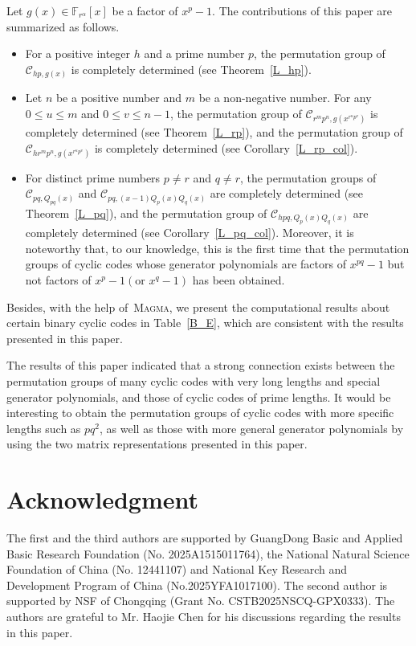 \documentclass[journal,12pt,onecolumn]{IEEEtran}
\begin{document}
Let $g(x)\in\mathbb{F}_{r^\alpha}[x]$ be a factor of $x^p-1$. The contributions of this paper are summarized as follows.
\begin{itemize}
    \item For a positive integer $h$ and a prime number $p$, the permutation group of $\mathcal{C}_{hp,g(x)}$ is completely determined (see Theorem~\ref{L_hp}). 
    \item Let $n$ be a positive number and $m$ be a non-negative number. For any $0\le u\le m$ and $0\le v\le n-1$, the permutation group of $\mathcal{C}_{r^mp^n,g(x^{r^up^v})}$ is completely determined (see Theorem~\ref{L_rp}), and the permutation group of $\mathcal{C}_{hr^mp^n,g(x^{r^up^v})}$ is completely determined (see Corollary~\ref{L_rp_col}). 
    \item For distinct prime numbers $p\neq r$ and $q\neq r$, the permutation groups  of $\mathcal{C}_{pq,Q_{pq}(x)}$ and $\mathcal{C}_{pq,(x-1)Q_p(x)Q_q(x)}$ are completely determined (see Theorem~\ref{L_pq}), and the permutation group of $\mathcal{C}_{hpq,Q_p(x)Q_q(x)}$ are completely determined (see Corollary~\ref{L_pq_col}). Moreover, it is noteworthy that, to our knowledge, this is the first time that the permutation groups of cyclic codes whose generator polynomials are factors of $x^{pq}-1$ but not factors of $x^p-1(\text{or }x^q-1)$ has been obtained.
\end{itemize}
Besides, with the help of~\textsc{Magma}, we present the computational results about certain binary cyclic codes in Table~\ref{B_E}, which are consistent with the results presented in this paper. 

The results of this paper indicated that a strong connection exists between the permutation groups of many cyclic codes with very long lengths and special generator polynomials, and those of cyclic codes of prime lengths. It would be interesting to obtain the permutation groups of cyclic codes with more specific lengths such as $pq^2$, as well as those with more general generator polynomials by using the two matrix representations presented in this paper. 



\section*{Acknowledgment}

The first and the third authors are supported by GuangDong Basic and Applied Basic Research Foundation (No. 2025A1515011764), the National Natural Science Foundation of China (No. 12441107) and National Key Research and Development Program of
China (No.2025YFA1017100). The second author is supported by NSF of Chongqing (Grant No. CSTB2025NSCQ-GPX0333). The authors are grateful to Mr. Haojie Chen for his discussions regarding the results in this paper.






















\end{document}
